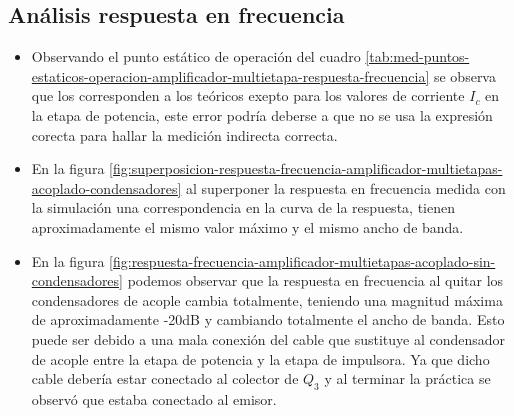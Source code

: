 \subsection{Análisis respuesta en frecuencia}


\begin{itemize}
    \item Observando el punto estático de operación del cuadro \ref{tab:med-puntos-estaticos-operacion-amplificador-multietapa-respuesta-frecuencia} se observa que los corresponden a los teóricos exepto para los valores de corriente $I_c$ en la etapa de potencia, este error podría deberse a que no se usa la expresión corecta para hallar la medición indirecta correcta.
    \item En la figura \ref{fig:superposicion-respuesta-frecuencia-amplificador-multietapas-acoplado-condensadores} al superponer la respuesta en frecuencia medida con la simulación una correspondencia en la curva de la respuesta, tienen aproximadamente el mismo valor máximo y el mismo ancho de banda.
    \item En la figura \ref{fig:respuesta-frecuencia-amplificador-multietapas-acoplado-sin-condensadores} podemos observar que la respuesta en frecuencia al quitar los condensadores de acople cambia totalmente, teniendo una magnitud máxima de aproximadamente -20dB y cambiando totalmente el ancho de banda. Esto puede ser debido a una mala conexión del cable que sustituye al condensador de acople entre la etapa de potencia y la etapa de impulsora. Ya que dicho cable debería estar conectado al colector de $Q_3$ y al terminar la práctica se observó que estaba conectado al emisor.

\end{itemize}